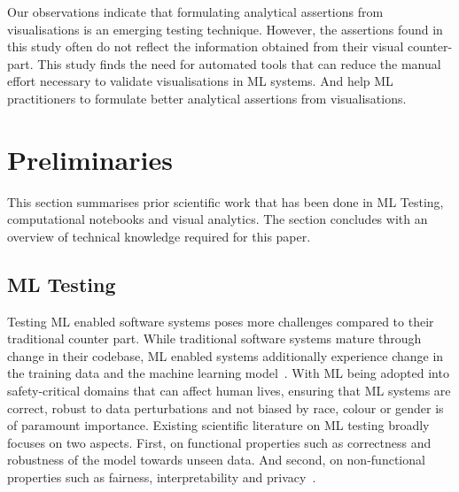 \documentclass[conference]{IEEEtran}
\begin{document}
Our observations indicate that formulating analytical assertions from visualisations is an emerging testing technique. However, the assertions found in this study often do not reflect the information obtained from their visual counter-part. This study finds the need for automated tools that can reduce the manual effort necessary to validate visualisations in ML systems. And help ML practitioners to formulate better analytical assertions from visualisations.

\section{Preliminaries}\label{sec:prelim}

This section summarises prior scientific work that has been done in ML Testing, computational notebooks and visual analytics. The section concludes with an overview of technical knowledge required for this paper.

\subsection{ML Testing}\label{sec:ml-testing}

Testing ML enabled software systems poses more challenges compared to their traditional counter part. While traditional software systems mature through change in their codebase, ML enabled systems additionally experience change in the training data and the machine learning model~\cite{sculley2015hidden,amershi2019software,sambasivan2021everyone}. With ML being adopted into safety-critical domains that can affect human lives, ensuring that ML systems are correct, robust to data perturbations and not biased by race, colour or gender is of paramount importance. Existing scientific literature on ML testing broadly focuses on two aspects. First, on functional properties such as correctness and robustness of the model towards unseen data. And second, on non-functional properties such as fairness, interpretability and privacy~\cite{zhang2020machine,mehrabi2021survey,chen2022fairness}.
\end{document}
